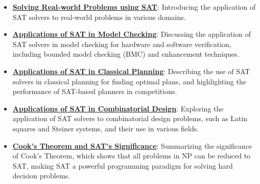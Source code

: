 \documentclass{article}%
\begin{document}
\begin{itemize}[leftmargin=*]
\item \href{https://purdue.brightspace.com/d2l/common/assets/pdfjs-d2l-dist/1.0.14-legacy/web/viewer.html?file=\%2Fcontent\%2Fenforced\%2F1095467-wl.202510.CS.24300.001\%2F15L2-SAT.pdf\%3Fou\%3D1095467\&lang=en-us\&container=d2l-fileviewer-rendered-pdf\&fullscreen=d2l-fileviewer-rendered-pdf-dialog\&height=667#page=37}{\textbf{Solving Real{-}world Problems using SAT}}: Introducing the application of SAT solvers to real-world problems in various domains.%
\item \href{https://purdue.brightspace.com/d2l/common/assets/pdfjs-d2l-dist/1.0.14-legacy/web/viewer.html?file=\%2Fcontent\%2Fenforced\%2F1095467-wl.202510.CS.24300.001\%2F15L2-SAT.pdf\%3Fou\%3D1095467\&lang=en-us\&container=d2l-fileviewer-rendered-pdf\&fullscreen=d2l-fileviewer-rendered-pdf-dialog\&height=667#page=51}{\textbf{Applications of SAT in Model Checking}}: Discussing the application of SAT solvers in model checking for hardware and software verification, including bounded model checking (BMC) and enhancement techniques.%
\item \href{https://purdue.brightspace.com/d2l/common/assets/pdfjs-d2l-dist/1.0.14-legacy/web/viewer.html?file=\%2Fcontent\%2Fenforced\%2F1095467-wl.202510.CS.24300.001\%2F15L2-SAT.pdf\%3Fou\%3D1095467\&lang=en-us\&container=d2l-fileviewer-rendered-pdf\&fullscreen=d2l-fileviewer-rendered-pdf-dialog\&height=667#page=52}{\textbf{Applications of SAT in Classical Planning}}: Describing the use of SAT solvers in classical planning for finding optimal plans, and highlighting the performance of SAT-based planners in competitions.%
\item \href{https://purdue.brightspace.com/d2l/common/assets/pdfjs-d2l-dist/1.0.14-legacy/web/viewer.html?file=\%2Fcontent\%2Fenforced\%2F1095467-wl.202510.CS.24300.001\%2F15L2-SAT.pdf\%3Fou\%3D1095467\&lang=en-us\&container=d2l-fileviewer-rendered-pdf\&fullscreen=d2l-fileviewer-rendered-pdf-dialog\&height=667#page=53}{\textbf{Applications of SAT in Combinatorial Design}}: Exploring the application of SAT solvers to combinatorial design problems, such as Latin squares and Steiner systems, and their use in various fields.%
\item \href{https://purdue.brightspace.com/d2l/common/assets/pdfjs-d2l-dist/1.0.14-legacy/web/viewer.html?file=\%2Fcontent\%2Fenforced\%2F1095467-wl.202510.CS.24300.001\%2F15L2-SAT.pdf\%3Fou\%3D1095467\&lang=en-us\&container=d2l-fileviewer-rendered-pdf\&fullscreen=d2l-fileviewer-rendered-pdf-dialog\&height=667#page=54}{\textbf{Cook's Theorem and SAT's Significance}}: Summarizing the significance of Cook's Theorem, which shows that all problems in NP can be reduced to SAT, making SAT a powerful programming paradigm for solving hard decision problems.%

\end{itemize}
\end{document}
